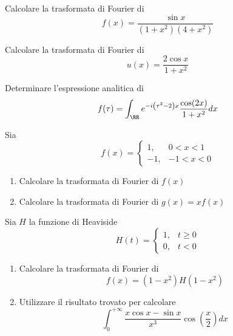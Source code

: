 \Esercizio{}

Calcolare la trasformata di Fourier di
\begin{equation*}
f(x) = \frac{\sin x}{\left(1 + x^{2}\right)\left(4 + x^{2}\right)}
\end{equation*}

\Esercizio{}

Calcolare la trasformata di Fourier di
\begin{equation*}
u(x) = \frac{2\cos x}{1 + x^{2}}
\end{equation*}

\Esercizio{}

Determinare l'espressione analitica di
\begin{equation*}
f(\tau) = \int_{\RR} e^{- i\left(\tau^{2} - 2\right) x}\frac{\cos(2x)}{1 + x^{2}} dx
\end{equation*}

\Esercizio{}

Sia
\begin{equation*}
f(x) =
\begin{cases}
1, & 0 < x < 1\\
- 1, & - 1 < x < 0
\end{cases}
\end{equation*}
\begin{enumerate}
\item Calcolare la trasformata di Fourier di $f(x)$
\item Calcolare la trasformata di Fourier di $g(x) = xf(x)$
\end{enumerate}

\Esercizio{}

Sia $H$ la funzione di Heaviside
\begin{equation*}
H(t) =
\begin{cases}
1, & t \geq 0\\
0, & t < 0
\end{cases}
\end{equation*}
\begin{enumerate}
\item Calcolare la trasformata di Fourier di
\begin{equation*}
f(x) = \left(1 - x^{2}\right) H\left(1 - x^{2}\right)
\end{equation*}
\item Utilizzare il risultato trovato per calcolare
\begin{equation*}
\int^{+ \infty}_{0}\frac{x\cos x - \sin x}{x^{3}}\cos\left(\frac{x}{2}\right) dx
\end{equation*}
\end{enumerate}

